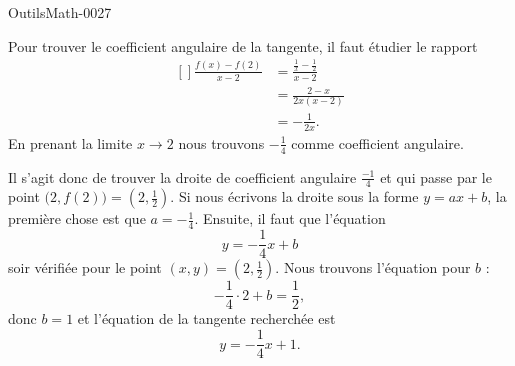 
\begin{corrige}{OutilsMath-0027}

	Pour trouver le coefficient angulaire de la tangente, il faut étudier le rapport
	\begin{equation}
		\begin{aligned}[]
			\frac{ f(x)-f(2) }{ x-2 }&=\frac{ \frac{1}{ x }-\frac{1}{ 2 } }{ x-2 }\\
			&=\frac{ 2-x }{ 2x(x-2) }\\
			&=-\frac{1}{ 2x }.
		\end{aligned}
	\end{equation}
	En prenant la limite $x\to 2$ nous trouvons $-\frac{1}{ 4 }$ comme coefficient angulaire.

	Il s'agit donc de trouver la droite de coefficient angulaire $\frac{-1}{ 4 }$ et qui passe par le point $\big( 2,f(2) \big)=(2,\frac{1}{ 2 })$. Si nous écrivons la droite sous la forme $y=ax+b$, la première chose est que $a=-\frac{1}{ 4 }$. Ensuite, il faut que l'équation
	\begin{equation}
		y=-\frac{1}{ 4 }x+b
	\end{equation}
	soir vérifiée pour le point $(x,y)=(2,\frac{1}{ 2 })$. Nous trouvons l'équation pour $b$ :
	\begin{equation}
		-\frac{ 1 }{4}\cdot 2+b=\frac{ 1 }{2},
	\end{equation}
	donc $b=1$ et l'équation de la tangente recherchée est
	\begin{equation}
		y=-\frac{1}{ 4 }x+1.
	\end{equation}

\end{corrige}
